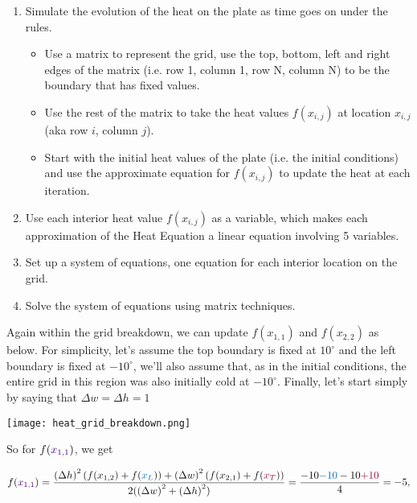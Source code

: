 \documentclass{ximera}
\begin{document}
\begin{enumerate}

    \item Simulate the evolution of the heat on the plate as time goes on under the rules. 
    
    \begin{itemize}
        
        \item Use a matrix to represent the grid, use the top, bottom, left and right edges of the matrix (i.e. row 1, column 1, row N, column N) to be the boundary that has fixed values. 
        \item Use the rest of the matrix to take the heat values $f(x_{i,j})$ at location $x_{i,j}$ (aka row $i$, column $j$).
        \item Start with the initial heat values of the plate (i.e. the initial conditions) and use the approximate equation for $f(x_{i,j})$ to update the heat at each iteration.
    \end{itemize}

    \item Use each interior heat value $f(x_{i,j})$ as a variable, which makes each approximation of the Heat Equation a linear equation involving 5 variables.
    \item Set up a system of equations, one equation for each interior location on the grid.
    \item Solve the system of equations using matrix techniques.

\end{enumerate}

Again within the grid breakdown, we can update $f(x_{1,1})$ and $f(x_{2,2})$ as below. For simplicity, let's assume the top boundary is fixed at $10^\circ$ and the left boundary is fixed at $-10^\circ$, we'll also assume that, as in the initial conditions, the entire grid in this region was also initially cold at $-10^\circ$. Finally, let's start simply by saying that $\Delta w=\Delta h=1$

\begin{center}
    \texttt{[image: heat\_grid\_breakdown.png]}
\end{center}

So for $f(\textcolor{darkpurple}{x_{1,1}})$, we get

$$f(\textcolor{darkpurple}{x_{1,1}})=\frac{\left(\Delta h\right)^2(f(x_{1,2})+f(\textcolor{darkbluishgreen}{x_L}))+\left(\Delta w\right)^2(f(x_{2,1})+f(\textcolor{crimsonred}{x_T}))}{2(\left(\Delta w\right)^2+\left(\Delta h\right)^2)}=\frac{-10\textcolor{darkbluishgreen}{-10}-10\textcolor{crimsonred}{+10}}{4}=-5,$$
\end{document}
